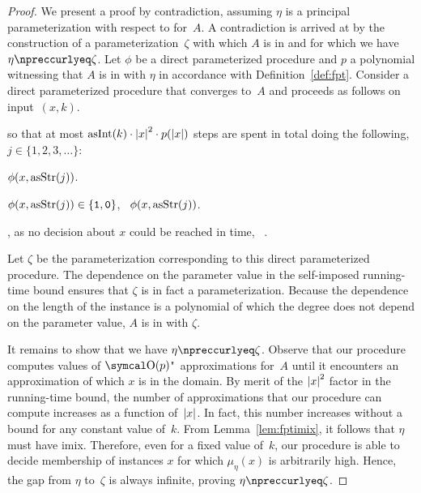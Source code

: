\begin{proof}
  We present a proof by contradiction, assuming $\eta$ is a principal parameterization with respect to  for~$A$.
  A contradiction is arrived at by the construction of a parameterization~$\zeta$ with which $A$ is in  and for which we have $\eta \notquasile \zeta$.
  Let $\phi$ be a direct parameterized procedure and $p$ a polynomial witnessing that $A$ is in  with $\eta$ in accordance with Definition~\ref{def:fpt}.
  Consider a direct parameterized procedure that converges to~$A$ and proceeds as follows on input~$(x, k)$.
  \begin{codelisting}
  \item
     so that at most $\asNat(k) \cdot \length{x}^2 \cdot p(\length{x})$ steps are spent in total doing the following,  $j \in \{1, 2, 3, \ldots\}$:
    \begin{codelisting}
    \item
       $\phi(x, \asStr(j))$.
    \item
       $\phi(x, \asStr(j)) \in \{\bits{1}, \bits{0}\}$, ~$\phi(x, \asStr(j))$.
    \end{codelisting}
  \item
    , as no decision about $x$ could be reached in time, ~.
  \end{codelisting}

  Let $\zeta$ be the parameterization corresponding to this direct parameterized procedure.
  The dependence on the parameter value in the self-imposed running-time bound ensures that $\zeta$ is in fact a parameterization.
  Because the dependence on the length of the instance is a polynomial of which the degree does not depend on the parameter value, $A$ is in  with $\zeta$.

  It remains to show that we have $\eta \notquasile \zeta$.
  Observe that our procedure computes values of $\bigO(p)$"~approximations for~$A$ until it encounters an approximation of which $x$ is in the domain.
  By merit of the ${\lvert x\rvert}^2$ factor in the running-time bound, the number of approximations that our procedure can compute increases as a function of~${\lvert x\rvert}$.
  In fact, this number increases without a bound for any constant value of~$k$.
  From Lemma~\ref{lem:fptimix}, it follows that $\eta$ must have imix.
  Therefore, even for a fixed value of~$k$, our procedure is able to decide membership of instances $x$ for which $\mu_\eta(x)$ is arbitrarily high.
  Hence, the gap from $\eta$ to~$\zeta$ is always infinite, proving $\eta \notquasile \zeta$.
\end{proof}
%

